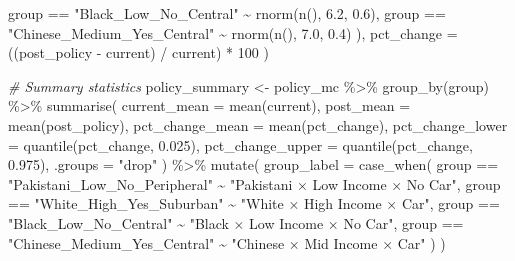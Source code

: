 \documentclass[
]{article}
\newenvironment{Shaded}{\begin{snugshade}}{\end{snugshade}}
\newcommand{\AttributeTok}[1]{\textcolor[rgb]{0.77,0.63,0.00}{#1}}
\newcommand{\CommentTok}[1]{\textcolor[rgb]{0.56,0.35,0.01}{\textit{#1}}}
\newcommand{\DecValTok}[1]{\textcolor[rgb]{0.00,0.00,0.81}{#1}}
\newcommand{\FloatTok}[1]{\textcolor[rgb]{0.00,0.00,0.81}{#1}}
\newcommand{\FunctionTok}[1]{\textcolor[rgb]{0.00,0.00,0.00}{#1}}
\newcommand{\NormalTok}[1]{#1}
\newcommand{\OtherTok}[1]{\textcolor[rgb]{0.56,0.35,0.01}{#1}}
\newcommand{\SpecialCharTok}[1]{\textcolor[rgb]{0.00,0.00,0.00}{#1}}
\newcommand{\StringTok}[1]{\textcolor[rgb]{0.31,0.60,0.02}{#1}}
\begin{document}
\begin{Shaded}
\begin{Highlighting}[]
\NormalTok{      group }\SpecialCharTok{==} \StringTok{"Black\_Low\_No\_Central"} \SpecialCharTok{\textasciitilde{}} \FunctionTok{rnorm}\NormalTok{(}\FunctionTok{n}\NormalTok{(), }\FloatTok{6.2}\NormalTok{, }\FloatTok{0.6}\NormalTok{),}
\NormalTok{      group }\SpecialCharTok{==} \StringTok{"Chinese\_Medium\_Yes\_Central"} \SpecialCharTok{\textasciitilde{}} \FunctionTok{rnorm}\NormalTok{(}\FunctionTok{n}\NormalTok{(), }\FloatTok{7.0}\NormalTok{, }\FloatTok{0.4}\NormalTok{)}
\NormalTok{    ),}
    \AttributeTok{pct\_change =}\NormalTok{ ((post\_policy }\SpecialCharTok{{-}}\NormalTok{ current) }\SpecialCharTok{/}\NormalTok{ current) }\SpecialCharTok{*} \DecValTok{100}
\NormalTok{  )}

\CommentTok{\# Summary statistics}
\NormalTok{policy\_summary }\OtherTok{\textless{}{-}}\NormalTok{ policy\_mc }\SpecialCharTok{\%\textgreater{}\%}
  \FunctionTok{group\_by}\NormalTok{(group) }\SpecialCharTok{\%\textgreater{}\%}
  \FunctionTok{summarise}\NormalTok{(}
    \AttributeTok{current\_mean =} \FunctionTok{mean}\NormalTok{(current),}
    \AttributeTok{post\_mean =} \FunctionTok{mean}\NormalTok{(post\_policy),}
    \AttributeTok{pct\_change\_mean =} \FunctionTok{mean}\NormalTok{(pct\_change),}
    \AttributeTok{pct\_change\_lower =} \FunctionTok{quantile}\NormalTok{(pct\_change, }\FloatTok{0.025}\NormalTok{),}
    \AttributeTok{pct\_change\_upper =} \FunctionTok{quantile}\NormalTok{(pct\_change, }\FloatTok{0.975}\NormalTok{),}
    \AttributeTok{.groups =} \StringTok{"drop"}
\NormalTok{  ) }\SpecialCharTok{\%\textgreater{}\%}
  \FunctionTok{mutate}\NormalTok{(}
    \AttributeTok{group\_label =} \FunctionTok{case\_when}\NormalTok{(}
\NormalTok{      group }\SpecialCharTok{==} \StringTok{"Pakistani\_Low\_No\_Peripheral"} \SpecialCharTok{\textasciitilde{}} \StringTok{"Pakistani × Low Income × No Car"}\NormalTok{,}
\NormalTok{      group }\SpecialCharTok{==} \StringTok{"White\_High\_Yes\_Suburban"} \SpecialCharTok{\textasciitilde{}} \StringTok{"White × High Income × Car"}\NormalTok{,}
\NormalTok{      group }\SpecialCharTok{==} \StringTok{"Black\_Low\_No\_Central"} \SpecialCharTok{\textasciitilde{}} \StringTok{"Black × Low Income × No Car"}\NormalTok{,}
\NormalTok{      group }\SpecialCharTok{==} \StringTok{"Chinese\_Medium\_Yes\_Central"} \SpecialCharTok{\textasciitilde{}} \StringTok{"Chinese × Mid Income × Car"}
\NormalTok{    )}
\NormalTok{  )}


\end{Highlighting}
\end{Shaded}
\end{document}
